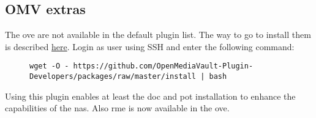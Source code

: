 

\subsection{OMV extras}

The \gls{ove} are not available in the default plugin list. The way to go to
install them is described \href{https://github.com/OpenMediaVault-Plugin-Developers/packages}{here}.
Login as user  using SSH and enter the following command:

\begin{figure}[H]
    \centering
    \begin{tiny}
        \begin{BVerbatim}
wget -O - https://github.com/OpenMediaVault-Plugin-Developers/packages/raw/master/install | bash
        \end{BVerbatim}
    \end{tiny}
\end{figure}

Using this plugin enables at least the \gls{doc} and \gls{pot} installation
to enhance the capabilities of the \gls{nas}. Also \gls{rme} is now available
in the \gls{ove}.


